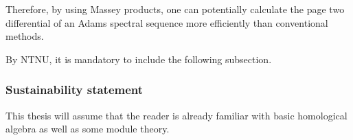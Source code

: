 Therefore, by using Massey products, one can potentially calculate the page two differential of an Adams spectral sequence more efficiently than conventional methods.

By NTNU, it is mandatory to include the following subsection.
\subsubsection{Sustainability statement}


This thesis will assume that the reader is already familiar with basic homological algebra as well as some module theory.
